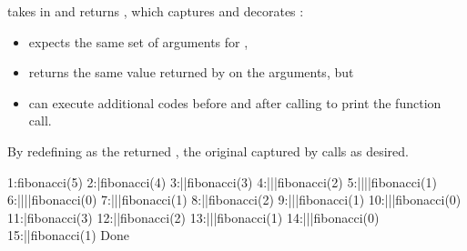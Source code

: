 \documentclass[letterpaper,10pt,english]{sphinxmanual}
\begin{document}
 takes in  and returns , which captures and decorates :
\begin{itemize}
\item {} 
 expects the same set of arguments for ,

\item {} 
returns the same value returned by  on the arguments, but

\item {} 
can execute additional codes before and after calling  to print the function call.

\end{itemize}

By redefining  as the returned , the original  captured by  calls  as desired.

\begin{sphinxVerbatim}[commandchars=\\\{\}]
 
                       


  
      
\end{sphinxVerbatim}

\begin{sphinxVerbatim}[commandchars=\\\{\}]
  1:fibonacci(5)
  2:|fibonacci(4)
  3:||fibonacci(3)
  4:|||fibonacci(2)
  5:||||fibonacci(1)
  6:||||fibonacci(0)
  7:|||fibonacci(1)
  8:||fibonacci(2)
  9:|||fibonacci(1)
 10:|||fibonacci(0)
 11:|fibonacci(3)
 12:||fibonacci(2)
 13:|||fibonacci(1)
 14:|||fibonacci(0)
 15:||fibonacci(1)
Done
\end{sphinxVerbatim}
\end{document}
